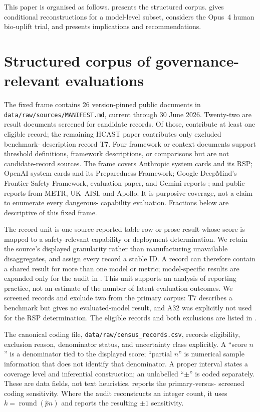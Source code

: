 \documentclass{article}
\begin{document}
This paper is organised as follows.  presents the structured corpus.  gives conditional reconstructions for a model-level subset,  considers the Opus~4 human bio-uplift trial, and  presents implications and recommendations.



\section{Structured corpus of governance-relevant evaluations}
\label{sec:census}

The fixed frame contains 26 version-pinned public documents in
\texttt{data/raw/sources/MANIFEST.md}, current through 30 June 2026. Twenty-two are result
documents screened for candidate records. Of those, \CensusSourceDocs{} contribute at
least one eligible record; the remaining HCAST paper contributes only excluded benchmark-
description record T7. Four framework or context documents support threshold definitions,
framework descriptions, or comparisons but are not candidate-record sources. The frame
covers Anthropic system cards and its RSP; OpenAI system cards and its Preparedness
Framework; Google DeepMind's Frontier Safety Framework, evaluation paper, and Gemini
reports \citep{phuong2024evaluating,deepmind2025gemini3}; and public reports from METR,
UK~AISI, and Apollo. It is purposive coverage, not a claim to enumerate every dangerous-
capability evaluation. Fractions below are descriptive of this fixed frame.

The record unit is one source-reported table row or prose result whose score is mapped to a
safety-relevant capability or deployment determination. We retain the source's displayed
granularity rather than manufacturing unavailable disaggregates, and assign every record a
stable ID. A record can therefore contain a shared result for more than one model or metric;
model-specific results are expanded only for the audit in . This unit
supports an analysis of reporting practice, not an estimate of the number of latent
evaluation outcomes. We screened \CensusScreened{} records and exclude two from the primary
corpus: T7 describes a benchmark but gives no evaluated-model result, and A32 was explicitly
not used for the RSP determination. The \CensusTotal{} eligible records and both exclusions
are listed in .

The canonical coding file, \texttt{data/raw/census\_records.csv}, records eligibility,
exclusion reason, denominator status, and uncertainty class explicitly. A ``score $n$'' is
a denominator tied to the displayed score; ``partial $n$'' is numerical sample information
that does not identify that denominator. A proper interval states a coverage level and
inferential construction; an unlabelled ``$\pm$'' is coded separately. These are data
fields, not text heuristics.  reports the primary-versus-
screened coding sensitivity. Where the audit reconstructs an integer count, it uses
$k=\operatorname{round}(\hat p n)$ and reports the resulting $\pm1$ sensitivity.
\end{document}
